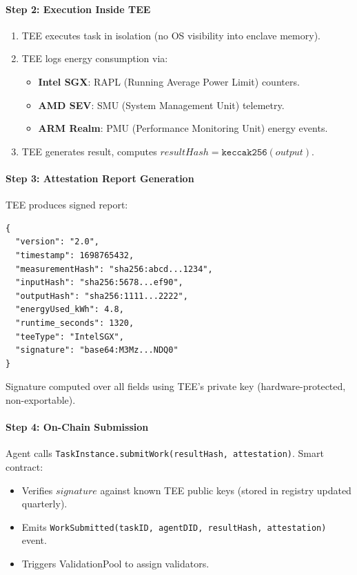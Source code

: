 \documentclass[11pt]{article}
\begin{document}
\paragraph{Step 2: Execution Inside TEE}
\begin{enumerate}[noitemsep]
  \item TEE executes task in isolation (no OS visibility into enclave memory).
  \item TEE logs energy consumption via:
    \begin{itemize}[noitemsep]
      \item \textbf{Intel SGX}: RAPL (Running Average Power Limit) counters.
      \item \textbf{AMD SEV}: SMU (System Management Unit) telemetry.
      \item \textbf{ARM Realm}: PMU (Performance Monitoring Unit) energy events.
    \end{itemize}
  \item TEE generates result, computes $resultHash = \texttt{keccak256}(output)$.
\end{enumerate}

\paragraph{Step 3: Attestation Report Generation}
TEE produces signed report:
\begin{verbatim}
{
  "version": "2.0",
  "timestamp": 1698765432,
  "measurementHash": "sha256:abcd...1234",
  "inputHash": "sha256:5678...ef90",
  "outputHash": "sha256:1111...2222",
  "energyUsed_kWh": 4.8,
  "runtime_seconds": 1320,
  "teeType": "IntelSGX",
  "signature": "base64:M3Mz...NDQ0"
}
\end{verbatim}
Signature computed over all fields using TEE's private key (hardware-protected, non-exportable).

\paragraph{Step 4: On-Chain Submission}
Agent calls \texttt{TaskInstance.submitWork(resultHash, attestation)}. Smart contract:
\begin{itemize}[noitemsep]
  \item Verifies $signature$ against known TEE public keys (stored in registry updated quarterly).
  \item Emits \texttt{WorkSubmitted(taskID, agentDID, resultHash, attestation)} event.
  \item Triggers ValidationPool to assign validators.
\end{itemize}
\end{document}
